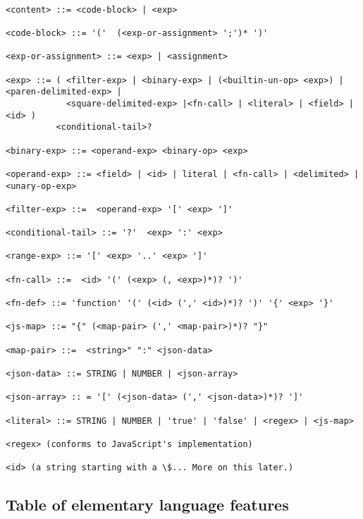 \documentclass[9pt,letterpaper]{article}
\begin{document}
\begin{Verbatim}[fontsize=\footnotesize]

<content> ::= <code-block> | <exp>
  
<code-block> ::= '('  (<exp-or-assignment> ';')* ')'

<exp-or-assignment> ::= <exp> | <assignment>

<exp> ::= ( <filter-exp> | <binary-exp> | (<builtin-un-op> <exp>) | <paren-delimited-exp> | 
            <square-delimited-exp> |<fn-call> | <literal> | <field> | <id> )
          <conditional-tail>?

<binary-exp> ::= <operand-exp> <binary-op> <exp>
          
<operand-exp> ::= <field> | <id> | literal | <fn-call> | <delimited> | <unary-op-exp>

<filter-exp> ::=  <operand-exp> '[' <exp> ']'

<conditional-tail> ::= '?'  <exp> ':' <exp>

<range-exp> ::= '[' <exp> '..' <exp> ']'

<fn-call> ::=  <id> '(' (<exp> (, <exp>)*)? ')'

<fn-def> ::= 'function' '(' (<id> (',' <id>)*)? ')' '{' <exp> '}'

<js-map> ::= "{" (<map-pair> (',' <map-pair>)*)? "}"

<map-pair> ::=  <string>" ":" <json-data> 

<json-data> ::= STRING | NUMBER | <json-array>

<json-array> :: = '[' (<json-data> (',' <json-data>)*)? ']'

<literal> ::= STRING | NUMBER | 'true' | 'false' | <regex> | <js-map>

<regex> (conforms to JavaScript's implementation)

<id> (a string starting with a \$... More on this later.)

\end{Verbatim}

\subsection{Table of elementary language features}
\end{document}
